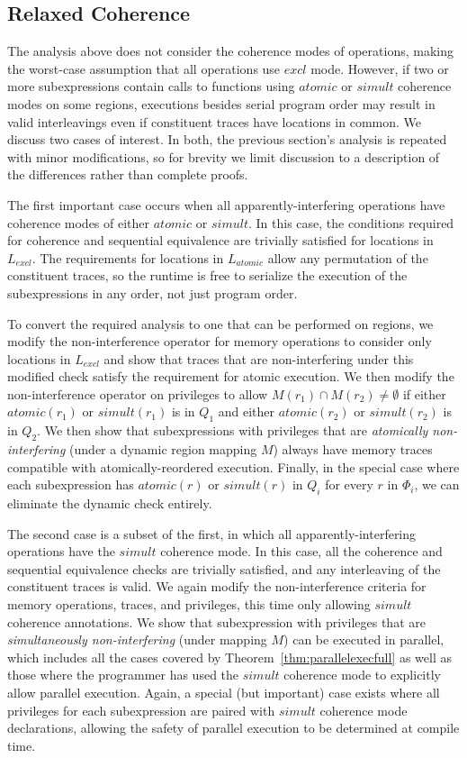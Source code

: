 \subsection{Relaxed Coherence}
\label{subsec:relaxedfull}

The analysis above does not consider the coherence modes of operations,
making the worst-case assumption that all operations use $excl$ mode.  However, if two or more
subexpressions contain calls to functions using $atomic$ or $simult$ coherence modes
on some regions, executions besides serial program order may 
result in valid interleavings even if constituent traces have locations in common.  We discuss
two cases of interest.  In both, the previous section's analysis 
is repeated with minor modifications, so for brevity we limit
discussion to a description of the differences rather than complete proofs.

The first important case occurs when all apparently-interfering operations have coherence modes
of either $atomic$ or $simult$.  In this case, the conditions required for
coherence and sequential equivalence are trivially satisfied for locations in $L_{excl}$.  The
requirements for locations in $L_{atomic}$ allow any permutation of the constituent traces,
so the runtime is free to serialize the execution of the subexpressions in any order, not just
program order.

To convert the required analysis to one that can be performed on regions, we modify
the non-interference operator for memory operations to consider only locations in $L_{excl}$ and show that
traces that are non-interfering under this modified check satisfy the requirement for atomic
execution.  We then modify the non-interference operator on privileges to allow 
$M(r_1) \cap M(r_2) \not= \emptyset$ if either $atomic(r_1)$ or $simult(r_1)$ is in $Q_1$ and
either $atomic(r_2)$ or $simult(r_2)$ is in $Q_2$. We then show that subexpressions with 
privileges that are {\em atomically non-interfering} (under a dynamic region mapping
$M$) always have memory traces compatible with atomically-reordered execution.  Finally,
in the special case where each subexpression has $atomic(r)$ or $simult(r)$ in $Q_i$ for every $r$
in $\Phi_i$, we can eliminate the dynamic check entirely.

The second case is a subset of the first, in which all apparently-interfering operations have
the $simult$ coherence mode.  In this case, all the coherence and sequential equivalence 
checks are trivially satisfied, and any interleaving of the constituent traces is valid.
We again modify the non-interference criteria for memory operations, traces, and privileges, this time
only allowing $simult$ coherence annotations. We show that subexpression with privileges
that are {\em simultaneously non-interfering} (under mapping $M$) can be executed
in parallel, which includes all the cases covered by Theorem~\ref{thm:parallelexecfull} as well
as those where the programmer has used the $simult$ coherence mode to explicitly allow parallel
execution.  Again, a special (but important) case exists where all privileges for each
subexpression are paired with $simult$ coherence mode declarations, allowing the safety of
parallel execution to be determined at compile time.

